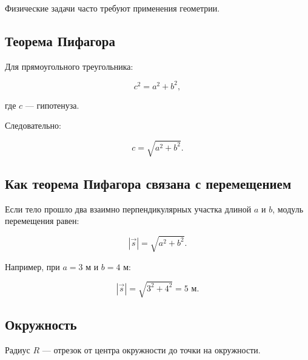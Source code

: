 \documentclass[a4paper,12pt]{article}
\begin{document}
Физические задачи часто требуют применения геометрии.

\subsection*{Теорема Пифагора}

Для прямоугольного треугольника:

\[
c^2=a^2+b^2,
\]

где $c$ --- гипотенуза.

Следовательно:

\[
c=\sqrt{a^2+b^2}.
\]

\begin{center}
\end{center}

\subsection*{Как теорема Пифагора связана с перемещением}

Если тело прошло два взаимно перпендикулярных участка
длиной $a$ и $b$, модуль перемещения равен:

\[
|\vec{s}|=\sqrt{a^2+b^2}.
\]

Например, при $a=3$ м и $b=4$ м:

\[
|\vec{s}|=\sqrt{3^2+4^2}=5\text{ м}.
\]

\subsection*{Окружность}

Радиус $R$ --- отрезок от центра окружности
до точки на окружности.
\end{document}
